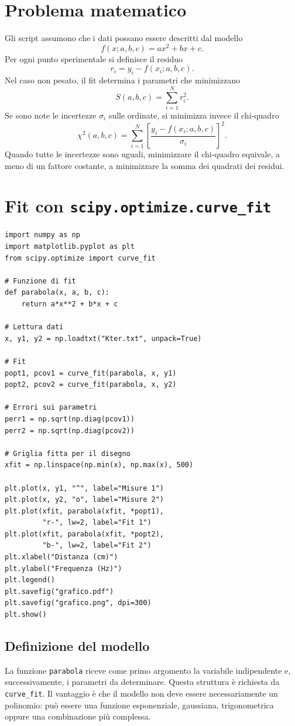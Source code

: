 \documentclass[11pt,a4paper]{book}
\begin{document}
\section{Problema matematico}
Gli script assumono che i dati possano essere descritti dal modello
\[
 f(x;a,b,c)=ax^2+bx+c.
\]
Per ogni punto sperimentale si definisce il residuo
\[
 r_i=y_i-f(x_i;a,b,c).
\]
Nel caso non pesato, il fit determina i parametri che minimizzano
\[
 S(a,b,c)=\sum_{i=1}^{N}r_i^2.
\]
Se sono note le incertezze $\sigma_i$ sulle ordinate, si minimizza invece il chi-quadro
\[
 \chi^2(a,b,c)=\sum_{i=1}^{N}
 \left[\frac{y_i-f(x_i;a,b,c)}{\sigma_i}\right]^2.
\]
Quando tutte le incertezze sono uguali, minimizzare il chi-quadro equivale, a meno di un fattore costante, a minimizzare la somma dei quadrati dei residui.

\section{Fit con \texttt{scipy.optimize.curve\_fit}}
\begin{lstlisting}
import numpy as np
import matplotlib.pyplot as plt
from scipy.optimize import curve_fit

# Funzione di fit
def parabola(x, a, b, c):
    return a*x**2 + b*x + c

# Lettura dati
x, y1, y2 = np.loadtxt("Kter.txt", unpack=True)

# Fit
popt1, pcov1 = curve_fit(parabola, x, y1)
popt2, pcov2 = curve_fit(parabola, x, y2)

# Errori sui parametri
perr1 = np.sqrt(np.diag(pcov1))
perr2 = np.sqrt(np.diag(pcov2))

# Griglia fitta per il disegno
xfit = np.linspace(np.min(x), np.max(x), 500)

plt.plot(x, y1, "^", label="Misure 1")
plt.plot(x, y2, "o", label="Misure 2")
plt.plot(xfit, parabola(xfit, *popt1),
         "r-", lw=2, label="Fit 1")
plt.plot(xfit, parabola(xfit, *popt2),
         "b-", lw=2, label="Fit 2")
plt.xlabel("Distanza (cm)")
plt.ylabel("Frequenza (Hz)")
plt.legend()
plt.savefig("grafico.pdf")
plt.savefig("grafico.png", dpi=300)
plt.show()
\end{lstlisting}

\subsection{Definizione del modello}
La funzione \texttt{parabola} riceve come primo argomento la variabile indipendente e, successivamente, i parametri da determinare. Questa struttura è richiesta da \texttt{curve\_fit}. Il vantaggio è che il modello non deve essere necessariamente un polinomio: può essere una funzione esponenziale, gaussiana, trigonometrica oppure una combinazione più complessa.
\end{document}
